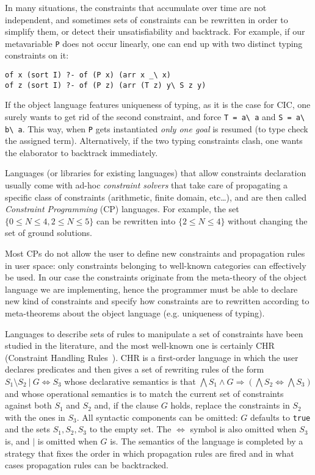 \documentclass{easychair}
\begin{document}
In many situations, the constraints that accumulate over time are not
independent, and sometimes sets of constraints can be rewritten in
order to simplify them, or detect their unsatisfiability and
backtrack.
For example, if our metavariable \verb+P+ does not occur linearly, one 
can end up with two distinct typing constraints on it:

\begin{Verbatim}
of x (sort I) ?- of (P x) (arr x _\ x)
of z (sort I) ?- of (P z) (arr (T z) y\ S z y)
\end{Verbatim}

If the object language features uniqueness of typing, as it is the case
for CIC, one surely wants to get rid of the second constraint, and
force \verb+T = a\ a+ and \verb+S = a\ b\ a+.
This way, when \verb+P+ gets instantiated \emph{only one goal}
is resumed (to type check the assigned term).  Alternatively,
if the two typing constraints clash, one wants the elaborator to
backtrack immediately.

Languages (or libraries for existing languages) that allow constraints declaration usually
come with ad-hoc \emph{constraint solvers} that take care of
propagating a specific class of constraints (arithmetic, finite
domain, etc\ldots), and are then called \emph{Constraint
Programming} (CP) languages.  For example, the set $\{0 \leq N \leq
4, 2 \leq N \leq 5\}$ can be rewritten into $\{2 \leq N \leq 4\}$
without changing the set of ground solutions.

Most CPs do not allow the user to define new constraints and
propagation rules in user space: only constraints belonging to well-known categories can effectively be used.  In our case the constraints
originate from the meta-theory of the object language we are implementing,
hence the programmer must be able to declare new kind of constraints and
specify how constraints are to rewritten according to meta-theorems about the
object language (e.g. uniqueness of typing).

Languages to describe sets of rules to manipulate a set of
constraints have been studied in the literature, and the most well-known one is certainly CHR (Constraint Handling Rules~\cite{chr}).
CHR is a first-order language in which the user declares predicates
and then gives a set of rewriting rules of the form $S_1 \setminus S_2 ~|~
G \iff S_3$ whose declarative semantics is that $\bigwedge S_1 \wedge
G \Rightarrow (\bigwedge S_2 \iff \bigwedge S_3)$ and whose
operational semantics is to match the current set of constraints
against both $S_1$ and $S_2$ and, if the clause $G$ holds, replace the
constraints in $S_2$ with the ones in $S_3$. All syntactic components
can be omitted: $G$ defaults to \verb+true+ and the sets $S_1,S_2,S_3$
to the empty set. The $\iff$ symbol is also omitted when $S_3$ is, and
$|$ is omitted when $G$ is. The semantics of the language is completed
by a strategy that fixes the order in which propagation rules are
fired and in what cases propagation rules can be backtracked.
\end{document}
